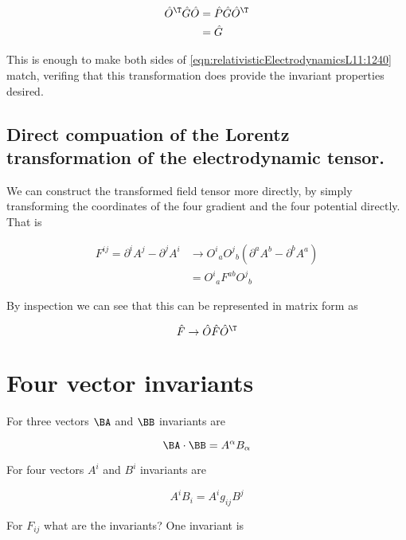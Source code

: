 \begin{align*}
\hat{O}^\T \hat{G} \hat{O}
&=
\hat{P} \hat{G} \hat{O}^\T \\
&=
\hat{G}
\end{align*}

This is enough to make both sides of \ref{eqn:relativisticElectrodynamicsL11:1240} match, verifing that this transformation does provide the invariant properties desired.

\subsection{Direct compuation of the Lorentz transformation of the electrodynamic tensor.}

We can construct the transformed field tensor more directly, by simply transforming the coordinates of the four gradient and the four potential directly.  That is

\begin{align*}
F^{i j} = 
\partial^i A^j - \partial^j A^i
&\rightarrow 
{O^i}_a 
{O^j}_b 
\left( \partial^a A^b - \partial^b A^a \right) \\
&=
{O^i}_a F^{a b} {O^j}_b 
\end{align*}

By inspection we can see that this can be represented in matrix form as

\begin{equation}\label{eqn:relativisticElectrodynamicsL11:1300}
\hat{F} \rightarrow \hat{O} \hat{F} \hat{O}^\T
\end{equation}

\section{Four vector invariants}

For three vectors $\BA$ and $\BB$ invariants are

\begin{equation}\label{eqn:relativisticElectrodynamicsL11:510}
\BA \cdot \BB = A^\alpha B_\alpha
\end{equation}

For four vectors $A^i$ and $B^i$ invariants are

\begin{equation}\label{eqn:relativisticElectrodynamicsL11:530}
A^i B_i = A^i g_{i j} B^j  
\end{equation}

For $F_{i j}$ what are the invariants?  One invariant is

